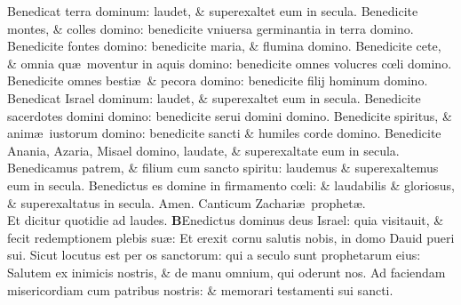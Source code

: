 \documentclass[a5paper,10pt]{book}
\def\ae{æ}
\def\oe{œ}
\begin{document}
\begin{multicols*}{2}
\newline \color{red} B\color{black}enedicat terra dominum: laudet, \& superexaltet eum in secula.
\newline \color{red} B\color{black}enedicite montes, \& colles domino: benedicite vniuersa germinantia in terra domino.
\newline \color{red} B\color{black}enedicite fontes domino: benedicite maria, \& flumina domino.
\newline \color{red} B\color{black}enedicite cete, \& omnia qu\ae \ moventur in aquis domino: benedicite omnes volucres c\oe li domino.
\newline \color{red} B\color{black}enedicite omnes besti\ae \ \& pecora domino: benedicite filij hominum domino.
\newline \color{red} B\color{black}enedicat Israel dominum: laudet, \& superexaltet eum in secula.
\newline \color{red} B\color{black}enedicite sacerdotes domini domino: benedicite serui domini domino.
\newline \color{red} B\color{black}enedicite spiritus, \& anim\ae \ iustorum domino: benedicite sancti \& humiles corde domino.
\newline \color{red} B\color{black}enedicite Anania, Azaria, Misael domino, laudate, \& superexaltate eum in secula.
\newline \color{red} B\color{black}enedicamus patrem, \& filium cum sancto spiritu: laudemus \& superexaltemus eum in secula.
\newline \color{red} B\color{black}enedictus es domine in firmamento c\oe li: \& laudabilis \& gloriosus, \& superexaltatus in secula. Amen.
\newline {} \color{red} \hypertarget{Benedictus}{Canticum} Zachari\ae \ prophet\ae .\\Et dicitur quotidie ad laudes. \color{black}
\vspace{-1em}
\lettrine[lines=2]{\bfseries \color{red} B}{}Enedictus dominus deus Israel: quia visitauit, \& fecit redemptionem plebis su\ae :
\newline \color{red} E\color{black}t erexit cornu salutis nobis, in domo Dauid pueri sui.
\newline \color{red} S\color{black}icut locutus est per os sanctorum: qui a seculo sunt prophetarum eius:
\newline \color{red} S\color{black}alutem ex inimicis nostris, \& de manu omnium, qui oderunt nos.
\newline \color{red} A\color{black}d faciendam misericordiam cum patribus nostris: \& memorari testamenti sui sancti.

\end{multicols*}
\end{document}
